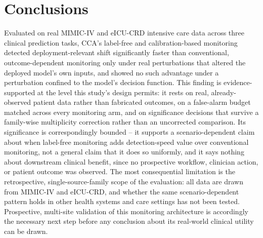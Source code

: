 \documentclass[preprintsapa,article,submit,oneauthor]{Definitions/mdpi}
\begin{document}
\section{Conclusions}

Evaluated on real MIMIC-IV and eICU-CRD intensive care data across three clinical prediction tasks, CCA's label-free and calibration-based monitoring detected deployment-relevant shift significantly faster than conventional, outcome-dependent monitoring only under real perturbations that altered the deployed model's own inputs, and showed no such advantage under a perturbation confined to the model's decision function. This finding is evidence-supported at the level this study's design permits: it rests on real, already-observed patient data rather than fabricated outcomes, on a false-alarm budget matched across every monitoring arm, and on significance decisions that survive a family-wise multiplicity correction rather than an uncorrected comparison. Its significance is correspondingly bounded -- it supports a scenario-dependent claim about when label-free monitoring adds detection-speed value over conventional monitoring, not a general claim that it does so uniformly, and it says nothing about downstream clinical benefit, since no prospective workflow, clinician action, or patient outcome was observed. The most consequential limitation is the retrospective, single-source-family scope of the evaluation: all data are drawn from MIMIC-IV and eICU-CRD, and whether the same scenario-dependent pattern holds in other health systems and care settings has not been tested. Prospective, multi-site validation of this monitoring architecture is accordingly the necessary next step before any conclusion about its real-world clinical utility can be drawn.

\vspace{6pt}



\end{document}
